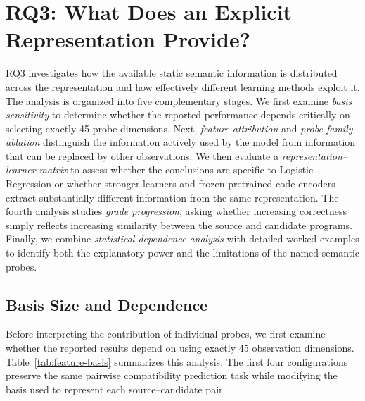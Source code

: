 \documentclass[conference]{IEEEtran}
\begin{document}
\section{RQ3: What Does an Explicit Representation Provide?}
\label{sec:rq3}
RQ3 investigates how the available static semantic information is distributed across the representation and how effectively different learning methods exploit it. The analysis is organized into five complementary stages. We first examine \emph{basis sensitivity} to determine whether the reported performance depends critically on selecting exactly 45 probe dimensions. Next, \emph{feature attribution} and \emph{probe-family ablation} distinguish the information actively used by the model from information that can be replaced by other observations. We then evaluate a \emph{representation--learner matrix} to assess whether the conclusions are specific to Logistic Regression or whether stronger learners and frozen pretrained code encoders extract substantially different information from the same representation. The fourth analysis studies \emph{grade progression}, asking whether increasing correctness simply reflects increasing similarity between the source and candidate programs. Finally, we combine \emph{statistical dependence analysis} with detailed worked examples to identify both the explanatory power and the limitations of the named semantic probes.

\subsection{Basis Size and Dependence}
Before interpreting the contribution of individual probes, we first examine whether the reported results depend on using exactly 45 observation dimensions. Table~\ref{tab:feature-basis} summarizes this analysis. The first four configurations preserve the same pairwise compatibility prediction task while modifying the basis used to represent each source--candidate pair.
\end{document}
